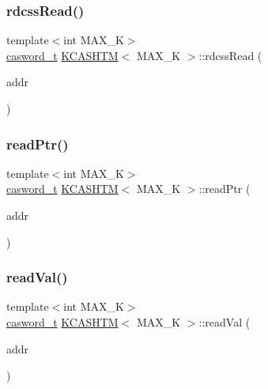 \mbox{\label{classKCASHTM_accfa276b0532e301dcd245c96a35fc1a}} 
\subsubsection{\texorpdfstring{rdcss\+Read()}{rdcssRead()}}
{\footnotesize\ttfamily template$<$int M\+A\+X\+\_\+K$>$ \\
\hyperlink{rq__unsafe_8h_ad45142aaf2ff20a036dc6242b8483e9c}{casword\+\_\+t} \hyperlink{classKCASHTM}{K\+C\+A\+S\+H\+TM}$<$ M\+A\+X\+\_\+K $>$\+::rdcss\+Read (\begin{DoxyParamCaption}\item[{\hyperlink{rq__unsafe_8h_ad45142aaf2ff20a036dc6242b8483e9c}{casword\+\_\+t} volatile $\ast$}]{addr }\end{DoxyParamCaption})}

\mbox{\label{classKCASHTM_aa655018e007f3c1604023541ca24b653}} 
\subsubsection{\texorpdfstring{read\+Ptr()}{readPtr()}}
{\footnotesize\ttfamily template$<$int M\+A\+X\+\_\+K$>$ \\
\hyperlink{rq__unsafe_8h_ad45142aaf2ff20a036dc6242b8483e9c}{casword\+\_\+t} \hyperlink{classKCASHTM}{K\+C\+A\+S\+H\+TM}$<$ M\+A\+X\+\_\+K $>$\+::read\+Ptr (\begin{DoxyParamCaption}\item[{\hyperlink{rq__unsafe_8h_ad45142aaf2ff20a036dc6242b8483e9c}{casword\+\_\+t} volatile $\ast$}]{addr }\end{DoxyParamCaption})}

\mbox{\label{classKCASHTM_a99b96913aad51e1e7128e8561230ded8}} 
\subsubsection{\texorpdfstring{read\+Val()}{readVal()}}
{\footnotesize\ttfamily template$<$int M\+A\+X\+\_\+K$>$ \\
\hyperlink{rq__unsafe_8h_ad45142aaf2ff20a036dc6242b8483e9c}{casword\+\_\+t} \hyperlink{classKCASHTM}{K\+C\+A\+S\+H\+TM}$<$ M\+A\+X\+\_\+K $>$\+::read\+Val (\begin{DoxyParamCaption}\item[{\hyperlink{rq__unsafe_8h_ad45142aaf2ff20a036dc6242b8483e9c}{casword\+\_\+t} volatile $\ast$}]{addr }\end{DoxyParamCaption})}

